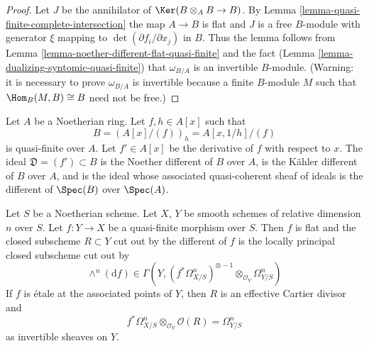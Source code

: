 \begin{proof}
Let $J$ be the annihilator of $\Ker(B \otimes_A B \to B)$.
By Lemma \ref{lemma-quasi-finite-complete-intersection}
the map $A \to B$ is flat and
$J$ is a free $B$-module with generator $\xi$ mapping to
$\det(\partial f_i/\partial x_j)$ in $B$.
Thus the lemma follows from
Lemma \ref{lemma-noether-different-flat-quasi-finite}
and the fact (Lemma \ref{lemma-dualizing-syntomic-quasi-finite})
that $\omega_{B/A}$ is an invertible $B$-module.
(Warning: it is necessary to prove $\omega_{B/A}$
is invertible because a finite $B$-module $M$ such
that $\Hom_B(M, B) \cong B$ need not be free.)
\end{proof}

\begin{example}
\label{example-different-for-monogenic}
Let $A$ be a Noetherian ring. Let $f, h \in A[x]$ such that
$$
B = (A[x]/(f))_h = A[x, 1/h]/(f)
$$
is quasi-finite over $A$. Let $f' \in A[x]$ be the derivative
of $f$ with respect to $x$. The ideal $\mathfrak{D} = (f') \subset B$
is the Noether different of $B$ over $A$,
is the K\"ahler different of $B$ over $A$, and
is the ideal whose associated quasi-coherent sheaf of ideals is the
different of $\Spec(B)$ over $\Spec(A)$.
\end{example}

\begin{lemma}
\label{lemma-discriminant-quasi-finite-morphism-smooth}
Let $S$ be a Noetherian scheme. Let $X$, $Y$ be smooth schemes
of relative dimension $n$ over $S$. Let $f : Y \to X$ be a
quasi-finite morphism over $S$.
Then $f$ is flat and the closed subscheme $R \subset Y$
cut out by the different of $f$ is the locally principal
closed subscheme cut out by
$$
\wedge^n(\text{d}f) \in
\Gamma(Y,
(f^*\Omega^n_{X/S})^{\otimes -1} \otimes_{\mathcal{O}_Y} \Omega^n_{Y/S})
$$
If $f$ is \'etale at the associated points of $Y$, then $R$ is an
effective Cartier divisor and
$$
f^*\Omega^n_{X/S} \otimes_{\mathcal{O}_Y} \mathcal{O}(R) =
\Omega^n_{Y/S}
$$
as invertible sheaves on $Y$.
\end{lemma}

